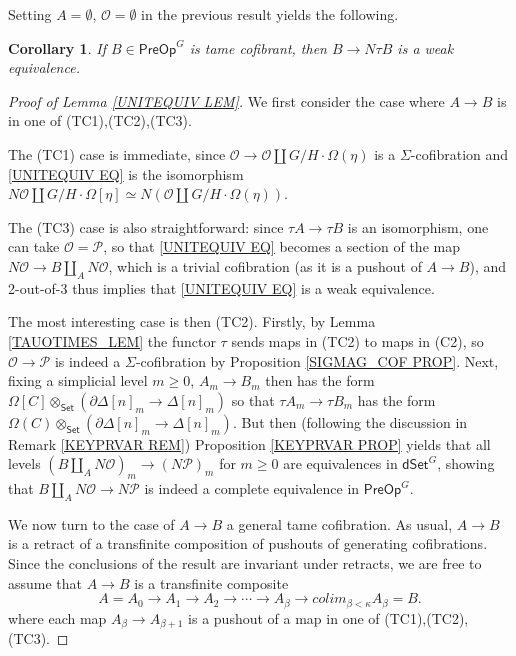 \documentclass[a4paper,10pt
,draft
]{article}%
\numberwithin{equation}{section}
\numberwithin{figure}{section}
\newtheorem{corollary}[equation]{Corollary}%
\theoremstyle{definition} %
\renewcommand{\O}{\ensuremath{\mathcal O}}
\renewcommand{\P}{\ensuremath{\mathcal P}}
\newcommand{\1}{\ensuremath{\mathbbm 1}}%
\begin{document}
Setting $A = \emptyset $, $\mathcal{O}= \emptyset$ in the previous result yields the following.

\begin{corollary}\label{KEYEQUIV COR}
	If $B \in \mathsf{PreOp}^G$ is tame cofibrant, then 
	$B \to N \tau B$ is a weak equivalence.
\end{corollary}

\begin{proof}[Proof of Lemma \ref{UNITEQUIV LEM}]
	We first consider the case where $A\to B$ is in one of (TC1),(TC2),(TC3).
	
	The (TC1) case is immediate, 
	since $\mathcal{O} \to \mathcal{O} \amalg G/H \cdot \Omega(\eta)$ is a $\Sigma$-cofibration and
	\eqref{UNITEQUIV EQ}
	is the isomorphism
	$N\mathcal{O} \amalg G/H\cdot \Omega[\eta] \simeq 
	N\left( \mathcal{O} \amalg G/H \cdot \Omega(\eta) \right)$.
	
	The (TC3) case is also straightforward:
	since $\tau A \to \tau B$ is an isomorphism, one can take 
	$\mathcal{O}=\mathcal{P}$, so that 
	\eqref{UNITEQUIV EQ}
	becomes a section of the map
	$N \mathcal{O} \to B \amalg_{A} N \mathcal{O}$, which is a trivial cofibration (as it is a pushout of $A \to B$),
	and 2-out-of-3 thus implies that \eqref{UNITEQUIV EQ} is a weak equivalence.

	The most interesting case is then (TC2).
	Firstly, by Lemma \ref{TAUOTIMES_LEM} the functor $\tau$ sends maps in (TC2) to maps in (C2), 
	so $\O \to \P$ is indeed a $\Sigma$-cofibration
	by {\color{red} Proposition \ref{SIGMAG_COF PROP}}.
	Next, fixing a simplicial level $m\geq 0$,
	$A_m \to B_m$ then has the form
	$\Omega[C] \otimes_{\mathsf{Set}} \left(\partial \Delta[n]_m \to \Delta[n]_m\right)$ so that
	$\tau A_m \to \tau B_m$ has the form
	$\Omega(C) \otimes_{\mathsf{Set}} \left(\partial \Delta[n]_m \to \Delta[n]_m\right)$.
	But then (following the discussion in 
	Remark \ref{KEYPRVAR REM})
	Proposition \ref{KEYPRVAR PROP}
	yields that all levels
	$(B \amalg_{A} N \mathcal{O})_m
	\to 
	(N \mathcal{P})_m$
	for $m \geq 0$
	are equivalences in $\mathsf{dSet}^G$,
	showing that 
	$B \amalg_{A} N \mathcal{O}
	\to 
	N \mathcal{P}$
	is indeed a complete equivalence in
	$\mathsf{PreOp}^G$.

	We now turn to the case of $A \to B$ a general tame cofibration.
	As usual, $A \to B$ is a retract of a transfinite composition of pushouts of generating cofibrations.
	Since the conclusions of the result are invariant under retracts,
	we are free to assume that $A \to B$ is a transfinite composite
	\[
	A = A_0 \to A_1 \to A_2 \to \cdots \to A_{\beta} \to 
	colim_{\beta < \kappa} A_{\beta} = B.
	\]
	where each map $A_{\beta} \to A_{\beta +1}$ is a pushout of a map in one of (TC1),(TC2),(TC3).


\end{proof}
\end{document}

